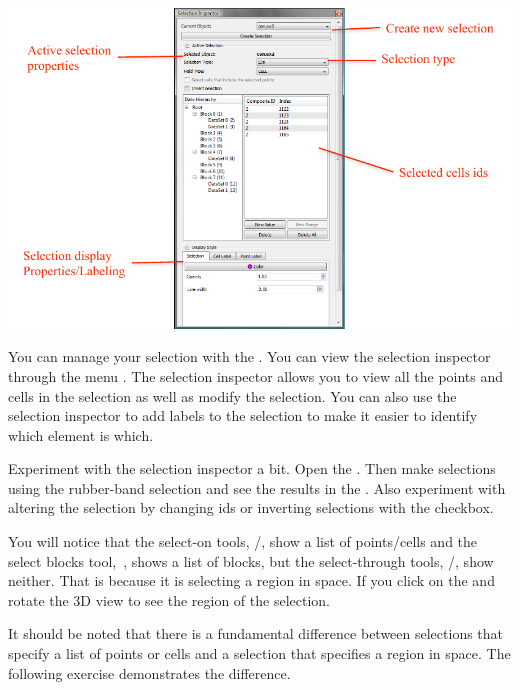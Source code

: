 \begin{inlinefig}
  \includegraphics[scale=\bbscale]{images/SelectionInspector}
\end{inlinefig}

You can manage your selection with the .  You
can view the selection inspector through the menu  \ra
{}.  The selection inspector allows you to view all
the points and cells in the selection as well as modify the selection.  You
can also use the selection inspector to add labels to the selection to make
it easier to identify which element is which.

Experiment with the selection inspector a bit.  Open the .  Then make selections using the rubber-band selection and see
the results in the .  Also experiment with
altering the selection by changing ids or inverting selections with the
 checkbox.

You will notice that the select-on tools, \selectCellsOn/\selectPointsOn,
show a list of points/cells and the select blocks tool,~\selectBlocks,
shows a list of blocks, but the select-through tools,
\selectCellsThrough/\selectPointsThrough, show neither.  That is because it
is selecting a region in space.  If you click on the  and
rotate the 3D view to see the region of the selection.

It should be noted that there is a fundamental difference between
selections that specify a list of points or cells and a selection that
specifies a region in space.  The following exercise demonstrates the
difference.

